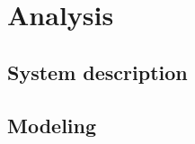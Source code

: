 
\part{Analysis}
\label{Analysis}

\chapter{System description}
\label{System_description}


\chapter{Modeling}
\label{modeling}













 
 